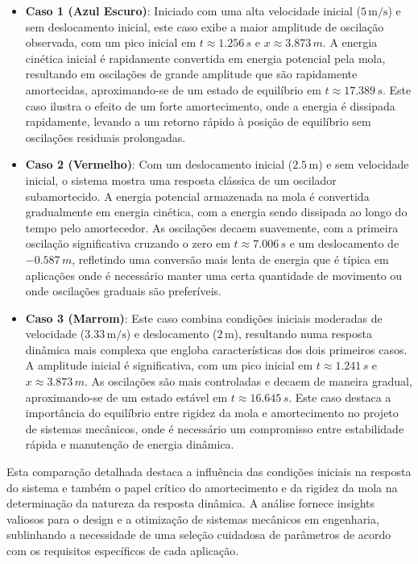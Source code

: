 \begin{itemize}
    \item \textbf{Caso 1 (Azul Escuro)}: Iniciado com uma alta velocidade inicial (\(5 \, \text{m/s}\)) e sem deslocamento inicial, este caso exibe a maior amplitude de oscilação observada, com um pico inicial em \(t \approx 1.256 \, s\) e \(x \approx 3.873 \, m\). A energia cinética inicial é rapidamente convertida em energia potencial pela mola, resultando em oscilações de grande amplitude que são rapidamente amortecidas, aproximando-se de um estado de equilíbrio em \(t \approx 17.389 \, s\). Este caso ilustra o efeito de um forte amortecimento, onde a energia é dissipada rapidamente, levando a um retorno rápido à posição de equilíbrio sem oscilações residuais prolongadas.

    \item \textbf{Caso 2 (Vermelho)}: Com um deslocamento inicial (\(2.5 \, \text{m}\)) e sem velocidade inicial, o sistema mostra uma resposta clássica de um oscilador subamortecido. A energia potencial armazenada na mola é convertida gradualmente em energia cinética, com a energia sendo dissipada ao longo do tempo pelo amortecedor. As oscilações decaem suavemente, com a primeira oscilação significativa cruzando o zero em \(t \approx 7.006 \, s\) e um deslocamento de \(-0.587 \, m\), refletindo uma conversão mais lenta de energia que é típica em aplicações onde é necessário manter uma certa quantidade de movimento ou onde oscilações graduais são preferíveis.

    \item \textbf{Caso 3 (Marrom)}: Este caso combina condições iniciais moderadas de velocidade (\(3.33 \, \text{m/s}\)) e deslocamento (\(2 \, \text{m}\)), resultando numa resposta dinâmica mais complexa que engloba características dos dois primeiros casos. A amplitude inicial é significativa, com um pico inicial em \(t \approx 1.241 \, s\) e \(x \approx 3.873 \, m\). As oscilações são mais controladas e decaem de maneira gradual, aproximando-se de um estado estável em \(t \approx 16.645 \, s\). Este caso destaca a importância do equilíbrio entre rigidez da mola e amortecimento no projeto de sistemas mecânicos, onde é necessário um compromisso entre estabilidade rápida e manutenção de energia dinâmica.
\end{itemize}

Esta comparação detalhada destaca a influência das condições iniciais na resposta do sistema e também o papel crítico do amortecimento e da rigidez da mola na determinação da natureza da resposta dinâmica. A análise fornece insights valiosos para o design e a otimização de sistemas mecânicos em engenharia, sublinhando a necessidade de uma seleção cuidadosa de parâmetros de acordo com os requisitos específicos de cada aplicação.

